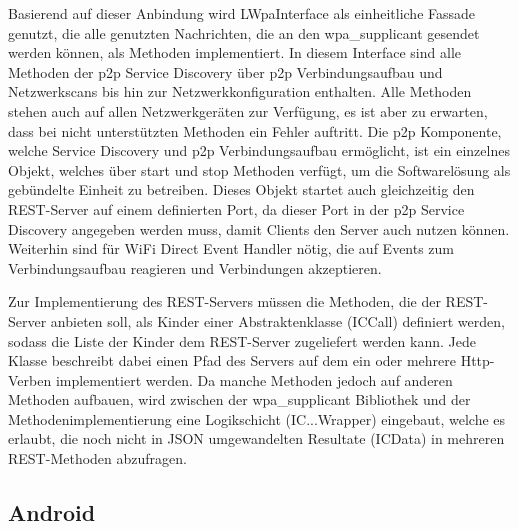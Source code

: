 		Basierend auf dieser Anbindung wird LWpaInterface als einheitliche Fassade genutzt, die alle genutzten Nachrichten, die an den wpa\_supplicant gesendet werden können, als Methoden implementiert.
		In diesem Interface sind alle Methoden der p2p Service Discovery über p2p Verbindungsaufbau und Netzwerkscans bis hin zur Netzwerkkonfiguration enthalten. Alle Methoden stehen auch auf allen Netzwerkgeräten zur Verfügung, es ist aber zu erwarten, dass bei nicht unterstützten Methoden ein Fehler auftritt.
		Die p2p Komponente, welche Service Discovery und p2p Verbindungsaufbau ermöglicht, ist ein einzelnes Objekt, welches über start und stop Methoden verfügt, um die Softwarelösung als gebündelte Einheit zu betreiben. Dieses Objekt startet auch gleichzeitig den REST-Server auf einem definierten Port, da dieser Port in der p2p Service Discovery angegeben werden muss, damit Clients den Server auch nutzen können. Weiterhin sind für WiFi Direct Event Handler nötig, die auf Events zum Verbindungsaufbau reagieren und Verbindungen akzeptieren.
		
		Zur Implementierung des REST-Servers müssen die Methoden, die der REST-Server anbieten soll, als Kinder einer Abstraktenklasse (ICCall) definiert werden, sodass die Liste der Kinder dem REST-Server zugeliefert werden kann.
		Jede Klasse beschreibt dabei einen Pfad des Servers auf dem ein oder mehrere Http-Verben implementiert werden. Da manche Methoden jedoch auf anderen Methoden aufbauen, wird zwischen der wpa\_supplicant Bibliothek und der Methodenimplementierung eine Logikschicht (IC...Wrapper) eingebaut, welche es erlaubt, die noch nicht in JSON umgewandelten Resultate (ICData) in mehreren REST-Methoden abzufragen.
		
	\subsection{Android}

